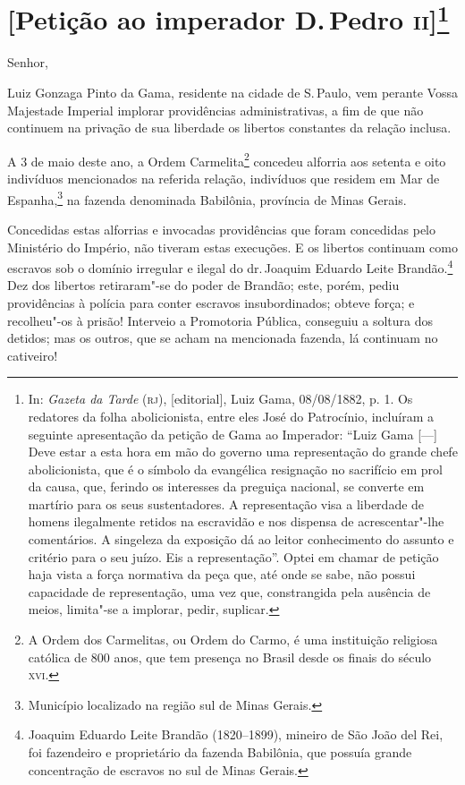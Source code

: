 \chapter{{[}Petição ao imperador D.\,Pedro \textsc{ii}{]}\footnote[*]{In:
  \emph{Gazeta da Tarde} (\textsc{rj}), {[}editorial{]}, Luiz Gama, 08/08/1882,
  p. 1. Os redatores da folha abolicionista, entre eles José do
  Patrocínio, incluíram a seguinte apresentação da petição de Gama ao
  Imperador: ``Luiz Gama {[}---{]} Deve estar a esta hora em mão do
  governo uma representação do grande chefe abolicionista, que é o
  símbolo da evangélica resignação no sacrifício em prol da causa, que,
  ferindo os interesses da preguiça nacional, se converte em martírio
  para os seus sustentadores.
  A representação visa a liberdade de homens ilegalmente retidos na
  escravidão e nos dispensa de acrescentar"-lhe comentários.
  A singeleza da exposição dá ao leitor conhecimento do assunto e
  critério para o seu juízo.
  Eis a representação''. Optei em chamar de petição haja vista a força
  normativa da peça que, até onde se sabe, não possui capacidade de
  representação, uma vez que, constrangida pela ausência de meios,
  limita"-se a implorar, pedir, suplicar.}}

Senhor,

Luiz Gonzaga Pinto da Gama, residente na cidade de S.\,Paulo, vem perante
Vossa Majestade Imperial implorar providências administrativas, a fim de
que não continuem na privação de sua liberdade os libertos constantes da
relação inclusa.

A 3 de maio deste ano, a Ordem Carmelita\footnote{A Ordem dos
  Carmelitas, ou Ordem do Carmo, é uma instituição religiosa católica de
  800 anos, que tem presença no Brasil desde os finais do século \textsc{xvi}.}
concedeu alforria aos setenta e oito indivíduos mencionados na referida
relação, indivíduos que residem em Mar de Espanha,\footnote{Município
  localizado na região sul de Minas Gerais.} na fazenda denominada
Babilônia, província de Minas Gerais.

Concedidas estas alforrias e invocadas providências que foram concedidas
pelo Ministério do Império, não tiveram estas execuções. E os libertos
continuam como escravos sob o domínio irregular e ilegal do dr.\,Joaquim
Eduardo Leite Brandão.\footnote{Joaquim Eduardo Leite Brandão
  (1820--1899), mineiro de São João del Rei, foi fazendeiro e
  proprietário da fazenda Babilônia, que possuía grande concentração de
  escravos no sul de Minas Gerais.} Dez dos libertos retiraram"-se do
poder de Brandão; este, porém, pediu providências à polícia para conter
escravos insubordinados; obteve força; e recolheu"-os à prisão! Interveio
a Promotoria Pública, conseguiu a soltura dos detidos; mas os outros,
que se acham na mencionada fazenda, lá continuam no cativeiro!

